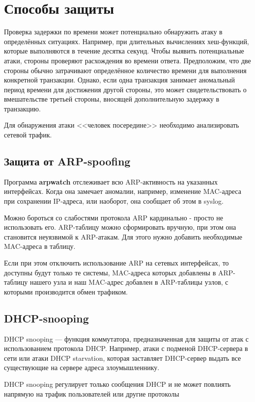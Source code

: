 \section{Способы защиты}

Проверка задержки по времени может потенциально обнаружить атаку в определённых ситуациях. Например, при длительных вычислениях хеш-функций, которые выполняются в течение десятка секунд. Чтобы выявить потенциальные атаки, стороны проверяют расхождения во времени ответа. Предположим, что две стороны обычно затрачивают определённое количество времени для выполнения конкретной транзакции. Однако, если одна транзакция занимает аномальный период времени для достижения другой стороны, это может свидетельствовать о вмешательстве третьей стороны, вносящей дополнительную задержку в транзакцию.

Для обнаружения атаки <<человек посередине>> необходимо анализировать сетевой трафик.

\subsection{Защита от ARP-spoofing}

Программа \textbf{arpwatch} отслеживает всю ARP-активность на указанных интерфейсах. Когда она замечает аномалии, например, изменение MAC-адреса при сохранении IP-адреса, или наоборот, она сообщает об этом в syslog.

Можно бороться со слабостями протокола ARP кардинально - просто не использовать его. ARP-таблицу можно сформировать вручную, при этом она становится неуязвимой к ARP-атакам. Для этого нужно добавить необходимые MAC-адреса в таблицу.

Если при этом отключить использование ARP на сетевых интерфейсах, то доступны будут только те системы, MAC-адреса которых добавлены в ARP-таблицу нашего узла и наш MAC-адрес добавлен в ARP-таблицы узлов, с которыми производится обмен трафиком.

\subsection{DHCP-snooping}
DHCP snooping — функция коммутатора, предназначенная для защиты от атак с использованием протокола DHCP. Например, атаки с подменой DHCP-сервера в сети или атаки DHCP starvation, которая заставляет
DHCP-сервер выдать все существующие на сервере адреса злоумышленнику.

DHCP snooping регулирует только сообщения DHCP и не может повлиять напрямую на трафик пользователей или другие протоколы

